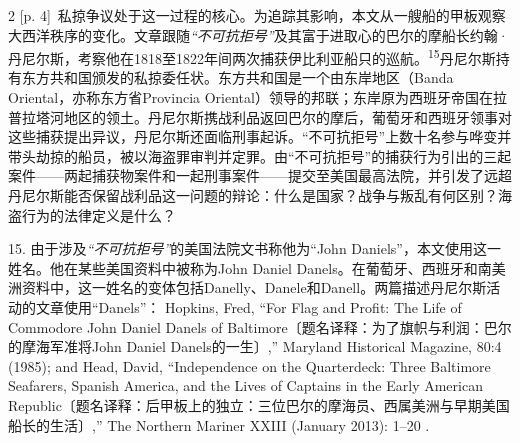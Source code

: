 \documentclass[10pt,a4paper]{article}
\begin{document}
\begin{paracol}{2}
{\scriptsize\color{gray} [p. 4]}\ 私掠争议处于这一过程的核心。为追踪其影响，本文从一艘船的甲板观察大西洋秩序的变化。文章跟随\textit{“不可抗拒号”}及其富于进取心的巴尔的摩船长约翰·丹尼尔斯，考察他在1818至1822年间两次捕获伊比利亚船只的巡\mbox{航。\textsuperscript{15}}丹尼尔斯持有东方共和国颁发的私掠委任状。东方共和国是一个由东岸地区（Banda Oriental，亦称东方省Provincia Oriental）领导的邦联；东岸原为西班牙帝国在拉普拉塔河地区的领土。丹尼尔斯携战利品返回巴尔的摩后，葡萄牙和西班牙领事对这些捕获提出异议，丹尼尔斯还面临刑事起诉。“不可抗拒号”上数十名参与哗变并带头劫掠的船员，被以海盗罪审判并定罪。由“不可抗拒号”的捕获行为引出的三起案件——两起捕获物案件和一起刑事案件——提交至美国最高法院，并引发了远超丹尼尔斯能否保留战利品这一问题的辩论：什么是国家？战争与叛乱有何区别？海盗行为的法律定义是什么？\par{\small 15. 由于涉及\textit{“不可抗拒号”}的美国法院文书称他为“John Daniels”，本文使用这一姓名。他在某些美国资料中被称为John Daniel Danels。在葡萄牙、西班牙和南美洲资料中，这一姓名的变体包括Danelly、Danele和Danell。两篇描述丹尼尔斯活动的文章使用“Danels”： Hopkins, Fred, “For Flag and Profit: The Life of Commodore John Daniel Danels of Baltimore〔题名译释：为了旗帜与利润：巴尔的摩海军准将John Daniel Danels的一生〕,” Maryland Historical Magazine, 80:4 (1985); and Head, David, “Independence on the Quarterdeck: Three Baltimore Seafarers, Spanish America, and the Lives of Captains in the Early American Republic〔题名译释：后甲板上的独立：三位巴尔的摩海员、西属美洲与早期美国船长的生活〕,” The Northern Mariner XXIII (January 2013): 1–20 .\par}
\switchcolumn

\end{paracol}
\end{document}
